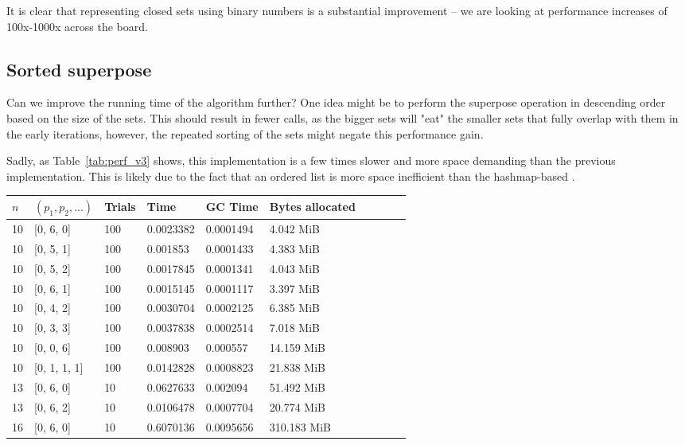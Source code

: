 It is clear that representing closed sets using binary numbers is a substantial improvement -- we are looking at performance increases of 100x-1000x across the board.


\subsection{Sorted superpose}
Can we improve the running time of the algorithm further? One idea might be to perform the superpose operation in descending order based on the size of the sets. This should result in fewer calls, as the bigger sets will "eat" the smaller sets that fully overlap with them in the early iterations, however, the repeated sorting of the sets might negate this performance gain.  

Sadly, as Table~\ref{tab:perf_v3} shows, this implementation is a few times slower and more space demanding than the previous implementation. This is likely due to the fact that an ordered list is more space inefficient than the hashmap-based \Set.

\begin{table*}[ht!]
  \centering
  \caption{Performance of $\texttt{randomized\_kmc\_v3}$.}
  \label{tab:perf_v3}
  \begin{threeparttable}
    \begin{tabular}{llllllllll}
      \toprule
      $n$ & $(p_1, p_2, \ldots)$ & Trials & Time  & GC Time & Bytes allocated \\
      \midrule
      10 & [0, 6, 0] & 100 & 0.0023382 & 0.0001494 & 4.042 MiB \\
      10 & [0, 5, 1] & 100 & 0.001853 & 0.0001433 & 4.383 MiB \\
      10 & [0, 5, 2] & 100 & 0.0017845 & 0.0001341 & 4.043 MiB \\
      10 & [0, 6, 1] & 100 & 0.0015145 & 0.0001117 & 3.397 MiB \\
      10 & [0, 4, 2] & 100 & 0.0030704 & 0.0002125 & 6.385 MiB \\
      10 & [0, 3, 3] & 100 & 0.0037838 & 0.0002514 & 7.018 MiB \\
      10 & [0, 0, 6] & 100 & 0.008903 & 0.000557 & 14.159 MiB \\
      10 & [0, 1, 1, 1] & 100 & 0.0142828 & 0.0008823 & 21.838 MiB \\
      13 & [0, 6, 0] & 10 & 0.0627633 & 0.002094 & 51.492 MiB \\
      13 & [0, 6, 2] & 10 & 0.0106478 & 0.0007704 & 20.774 MiB \\
      16 & [0, 6, 0] & 10 & 0.6070136 & 0.0095656 & 310.183 MiB \\
      \bottomrule
    \end{tabular}
  \end{threeparttable}
\end{table*}

